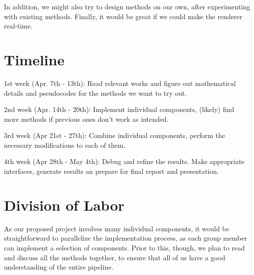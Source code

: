 \documentclass[acmtog, table, dvipsnames]{acmart}
\begin{document}
In addition, we might also try to design methods on our own, after experimenting with existing methods. Finally, it would be great if we could make the renderer real-time.
%
\section{Timeline}
1st week (Apr. 7th - 13th): Read relevant works and figure out mathematical details and pseudocodes for the methods we want to try out.

2nd week (Apr. 14th - 20th): Implement individual components, (likely) find more methods if previous ones don't work as intended.

3rd week (Apr 21st - 27th): Combine individual components, perform the necessary modifications to each of them.

4th week (Apr 28th - May 4th): Debug and refine the results. Make appropriate interfaces, generate results an prepare for final report and presentation.

\section{Division of Labor}
As our proposed project involves many individual components, it would be straightforward to parallelize the implementation process, as each group member can implement a selection of components. Prior to this, though, we plan to read and discuss all the methods together, to ensure that all of us have a good understanding of the entire pipeline.
%
%
%
\end{document}
